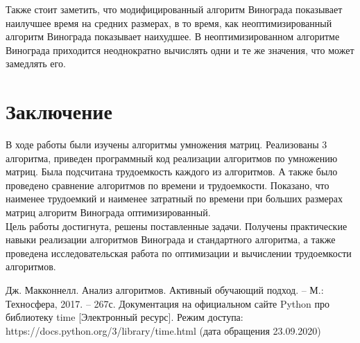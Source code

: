 \documentclass[12pt,a4paper]{report}
\begin{document}
Также стоит заметить, что модифицированный алгоритм Винограда показывает наилучшее время на средних размерах, в то 
время, как неоптимизированный алгоритм Винограда показывает наихудшее. 
В неоптимизированном алгоритме Винограда приходится неоднократно вычислять одни и те же значения, что может замедлять 
его.

\newpage
\chapter*{Заключение}

В ходе работы были изучены алгоритмы умножения матриц. 
Реализованы 3 алгоритма, приведен программный код реализации алгоритмов по умножению матриц.
Была подсчитана трудоемкость каждого из алгоритмов. 
А также было проведено сравнение алгоритмов по времени и трудоемкости. Показано, что наименее трудоемкий и наименее затратный по времени при больших размерах матриц алгоритм Винограда оптимизированный.\\

Цель работы достигнута, решены поставленные задачи.
Получены практические навыки реализации алгоритмов Винограда и стандартного алгоритма, а также проведена 
исследовательская работа по оптимизации и вычислении трудоемкости алгоритмов.

\newpage
\renewcommand\bibname{Список литературы}
\makeatletter %
\def\@biblabel#1{#1. }
\makeatother
\begin{thebibliography}{2}
     Дж. Макконнелл. Анализ алгоритмов. Активный обучающий подход. -- М.: Техносфера, 2017. -- 267с.
     Документация на официальном сайте Python про библиотеку time [Электронный ресурс]. Режим доступа: https://docs.python.org/3/library/time.html (дата обращения 23.09.2020)
\end{thebibliography}
\end{document}
